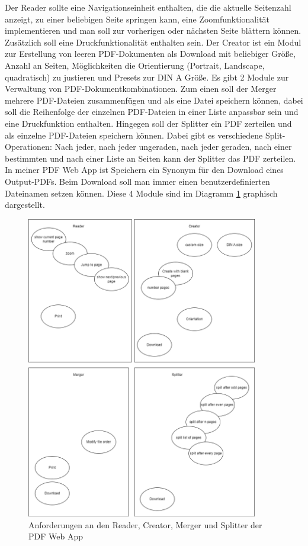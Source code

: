 Der Reader sollte eine Navigationseinheit enthalten, die die aktuelle Seitenzahl anzeigt, zu einer beliebigen Seite springen kann, eine Zoomfunktionalität implementieren und man soll zur vorherigen oder nächsten Seite blättern können. Zusätzlich soll eine Druckfunktionalität enthalten sein. Der Creator ist ein Modul zur Erstellung von leeren PDF-Dokumenten als Download mit beliebiger Größe, Anzahl an Seiten, Möglichkeiten die Orientierung (Portrait, Landscape, quadratisch) zu justieren und Presets zur DIN A Größe. Es gibt 2 Module zur Verwaltung von PDF-Dokumentkombinationen. Zum einen soll der Merger mehrere PDF-Dateien zusammenfügen und als eine Datei speichern können, dabei soll die Reihenfolge der einzelnen PDF-Dateien in einer Liste anpassbar sein und eine Druckfunktion enthalten. Hingegen soll der Splitter ein PDF zerteilen und als einzelne PDF-Dateien speichern können. Dabei gibt es verschiedene Split-Operationen: Nach jeder, nach jeder ungeraden, nach jeder geraden, nach einer bestimmten und nach einer Liste an Seiten kann der Splitter das PDF zerteilen. In meiner PDF Web App ist Speichern ein Synonym für den Download eines Output-PDFs. Beim Download soll man immer einen benutzerdefinierten Dateinamen setzen können. Diese 4 Module sind im Diagramm \ref{fig:modules4} graphisch dargestellt. 

\begin{figure}[!htb]
	\centering
	\includegraphics[width=0.9\textwidth]{"images/app-funktionen-anforderungen.png"}
	\caption{Anforderungen an den Reader, Creator, Merger und Splitter der PDF Web App}
	\label{fig:modules4}
\end{figure}

